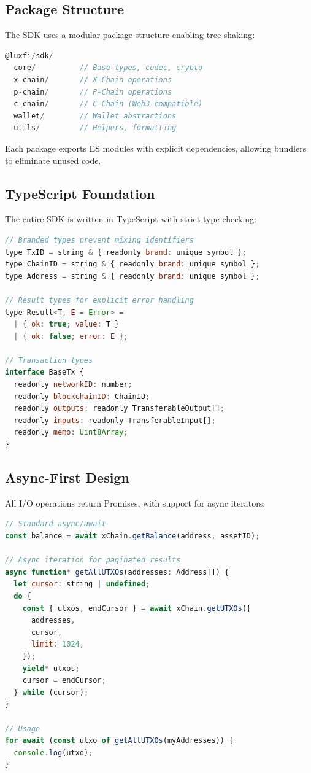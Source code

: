 \documentclass[11pt,twocolumn]{article}
\begin{document}
\subsection{Package Structure}

The SDK uses a modular package structure enabling tree-shaking:

\begin{lstlisting}[language=JavaScript,caption=Package Organization]
@luxfi/sdk/
  core/          // Base types, codec, crypto
  x-chain/       // X-Chain operations
  p-chain/       // P-Chain operations
  c-chain/       // C-Chain (Web3 compatible)
  wallet/        // Wallet abstractions
  utils/         // Helpers, formatting
\end{lstlisting}

Each package exports ES modules with explicit dependencies, allowing bundlers to eliminate unused code.

\subsection{TypeScript Foundation}

The entire SDK is written in TypeScript with strict type checking:

\begin{lstlisting}[language=JavaScript,caption=Type Definitions]
// Branded types prevent mixing identifiers
type TxID = string & { readonly brand: unique symbol };
type ChainID = string & { readonly brand: unique symbol };
type Address = string & { readonly brand: unique symbol };

// Result types for explicit error handling
type Result<T, E = Error> =
  | { ok: true; value: T }
  | { ok: false; error: E };

// Transaction types
interface BaseTx {
  readonly networkID: number;
  readonly blockchainID: ChainID;
  readonly outputs: readonly TransferableOutput[];
  readonly inputs: readonly TransferableInput[];
  readonly memo: Uint8Array;
}
\end{lstlisting}

\subsection{Async-First Design}

All I/O operations return Promises, with support for async iterators:

\begin{lstlisting}[language=JavaScript,caption=Async Patterns]
// Standard async/await
const balance = await xChain.getBalance(address, assetID);

// Async iteration for paginated results
async function* getAllUTXOs(addresses: Address[]) {
  let cursor: string | undefined;
  do {
    const { utxos, endCursor } = await xChain.getUTXOs({
      addresses,
      cursor,
      limit: 1024,
    });
    yield* utxos;
    cursor = endCursor;
  } while (cursor);
}

// Usage
for await (const utxo of getAllUTXOs(myAddresses)) {
  console.log(utxo);
}
\end{lstlisting}
\end{document}
